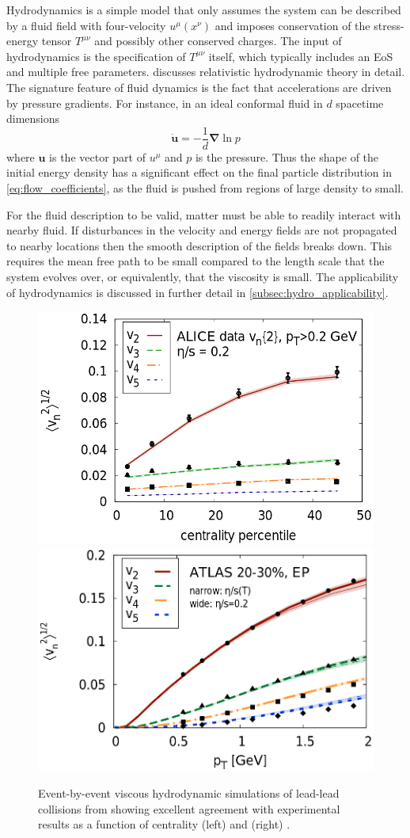 Hydrodynamics is a simple model that only assumes the system can be described by a fluid field with four-velocity $u^\mu(x^\nu)$ and imposes conservation of the stress-energy tensor $T^{\mu\nu}$ and possibly other conserved charges. %
The input of hydrodynamics is the specification of $T^{\mu\nu}$ itself, which typically includes an \ac{EoS} and multiple free parameters.
 discusses relativistic hydrodynamic theory in detail.
The signature feature of fluid dynamics is the fact that accelerations are driven by pressure gradients.
For instance, in an ideal conformal fluid in $d$ spacetime dimensions
\begin{equation}
\dot{\mathbf{u}} = - \frac{1}{d} \boldsymbol{\nabla} \ln p
\end{equation}
where $\mathbf{u}$ is the vector part of $u^\mu$ and $p$ is the pressure.
Thus the shape of the initial energy density has a significant effect on the final particle distribution in \cref{eq:flow_coefficients}, as the fluid is pushed from regions of large density to small.

For the fluid description to be valid, matter must be able to readily interact with nearby fluid.
If disturbances in the velocity and energy fields are not propagated to nearby locations then the smooth description of the fields breaks down.
This requires the mean free path \mfp to be small compared to the length scale that the system evolves over, or equivalently, that the viscosity is small.
The applicability of hydrodynamics is discussed in further detail in \cref{subsec:hydro_applicability}.

\begin{figure}[t]
  \includegraphics[width=0.49\linewidth]{vn_vs_cent.png}
  \includegraphics[width=0.49\linewidth]{vn_vs_pt.png}
  \caption{Event-by-event viscous hydrodynamic simulations of lead-lead collisions from  showing excellent agreement with experimental results as a function of centrality (left) \cite{ALICE:2011ab} and \pt (right) \cite{HION-2011-01}.}
  \label{fig:pbpb_vn}
\end{figure}


